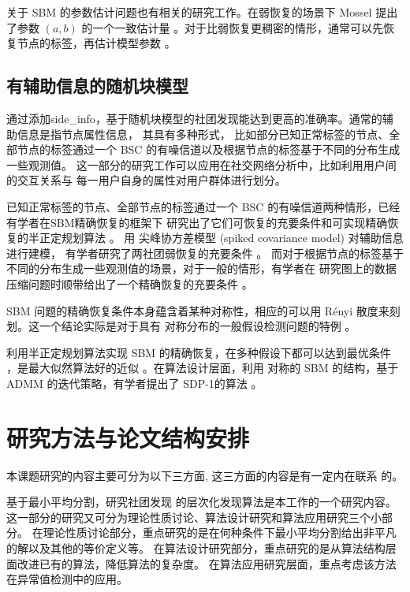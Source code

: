 关于 SBM 的参数估计问题也有相关的研究工作。在弱恢复的场景下 Mossel 提出了参数 $(a,b)$ 的一个一致估计量
\cite{mossel2015reconstruction}。对于比弱恢复更稠密的情形，通常可以先恢复节点的标签，再估计模型参数
\cite{abbe2015recovering}。

\subsection{有辅助信息的随机块模型}
通过添加\gls{side_info}，基于随机块模型的社团发现能达到更高的准确率。通常的辅助信息是指节点属性信息\cite{1021723343.nh}，
其具有多种形式，
比如部分已知正常标签的节点、全部节点的标签通过一个 BSC 的有噪信道以及根据节点的标签基于不同的分布生成一些观测值\cite{saad2018community}。
这一部分的研究工作可以应用在社交网络分析中，比如利用用户间的交互关系与
每一用户自身的属性对用户群体进行划分。

已知正常标签的节点、全部节点的标签通过一个 BSC 的有噪信道两种情形，已经有学者在SBM精确恢复的框架下
研究出了它们可恢复的充要条件和可实现精确恢复的半正定规划算法 \cite{esmaeili2019community, esmaeili2019exact}。
用 尖峰协方差模型 (spiked covariance model) 对辅助信息
进行建模，
有学者研究了两社团弱恢复的充要条件 \cite{deshpande2018contextual}。
而对于根据节点的标签基于不同的分布生成一些观测值的场景，对于一般的情形，有学者在
研究图上的数据压缩问题时顺带给出了一个精确恢复的充要条件 \cite{abbe17sideinfo}。

SBM 问题的精确恢复条件本身蕴含着某种对称性，相应的可以用 Rényi 散度来刻划。这一个结论实际是对于具有
对称分布的一般假设检测问题的特例 \cite{gao2018community}。

利用半正定规划算法实现 SBM 的精确恢复，在多种假设下都可以达到最优条件 \cite{hajek2016achieving}，是最大似然算法好的近似 。在算法设计层面，利用 对称的 SBM 的结构，基于 ADMM 的迭代策略，有学者提出了 SDP-1的算法 \cite{amini2018semidefinite}。

\section{研究方法与论文结构安排}
本课题研究的内容主要可分为以下三方面, 这三方面的内容是有一定内在联系
的。

基于最小平均分割，研究社团发现
的层次化发现算法是本工作的一个研究内容。这一部分的研究又可分为理论性质讨论、算法设计研究和算法应用研究三个小部分。
在理论性质讨论部分，重点研究的是在何种条件下最小平均分割给出非平凡的解以及其他的等价定义等。
在算法设计研究部分，重点研究的是从算法结构层面改进已有的算法，降低算法的复杂度。
在算法应用研究层面，重点考虑该方法在异常值检测中的应用。
 
